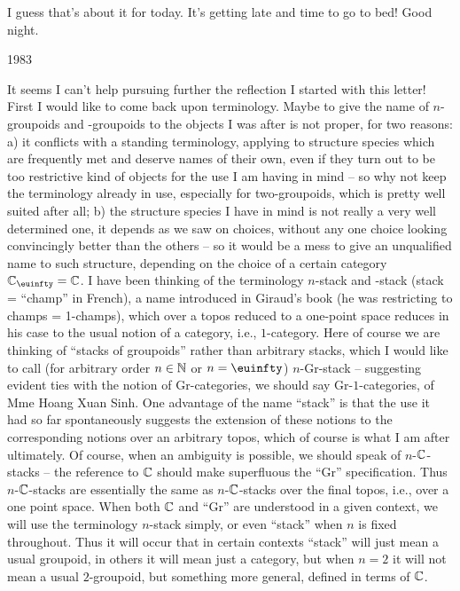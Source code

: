 I guess that's about it for today. It's getting late and time to go to
bed! Good night.

\bigbreak

\noindent\hfill{}1983\par

\label{sec:13}%
It seems I can't help pursuing further the reflection I started with
this letter! First I would like to come back upon terminology. Maybe
to give the name of $n$-groupoids and \oo-groupoids to the objects I
was after is not proper, for two reasons: a) it conflicts with a
standing terminology, applying to structure species which are
frequently met and deserve names of their own, even if they turn out
to be too restrictive kind of objects for the use I am having in mind
-- so why not keep the terminology already in use, especially for
two-groupoids, which is pretty well suited after all; b) the structure
species I have in mind is not really a very well determined one, it
depends as we saw on choices, without any one choice looking
convincingly better than the others -- so it would be a mess to give
an unqualified name to such structure, depending on the choice of a
certain category $\bC_\oo = \bC$. I have been thinking of the
terminology $n$-stack and \oo-stack (stack = ``champ'' in French), a
name introduced in Giraud's book (he was restricting to champs =
1-champs), which over a topos reduced to a one-point space reduces in
his case to the usual notion of a category, i.e., $1$-category. Here
of course we are thinking of ``stacks of groupoids'' rather than
arbitrary stacks, which I would like to call (for arbitrary order
$n\in{\ensuremath{\mathbb{N}}}$ or $n=\oo$) $n$-Gr-stack -- suggesting evident ties with the
notion of Gr-categories, we should say Gr-$1$-categories, of Mme Hoang
Xuan Sinh. One advantage of the name ``stack'' is that the use it had
so far spontaneously suggests the extension of these notions to the
corresponding notions over an arbitrary topos, which of course is what
I am after ultimately. Of course, when an ambiguity is possible, we
should speak of $n$-${\mathbb{C}}$-stacks -- the reference to ${\mathbb{C}}$
should make superfluous the ``Gr'' specification. Thus $n$-${\mathbb{C}}$-stacks
are essentially the same as $n$-${\mathbb{C}}$-stacks over the
final topos, i.e., over a one point space. When both ${\mathbb{C}}$ and
``Gr'' are understood in a given context, we will use the terminology
$n$-stack simply, or even ``stack'' when $n$ is fixed throughout. Thus
it will occur that in certain contexts ``stack'' will just mean a
usual groupoid, in others it will mean just a category, but when $n=2$
it will not mean a usual $2$-groupoid, but something more general,
defined in terms of ${\mathbb{C}}$.

